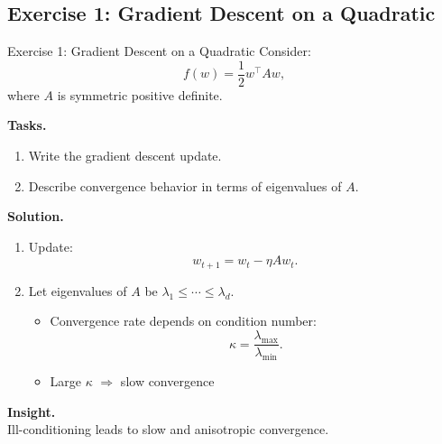 \documentclass[aspectratio=169,11pt]{beamer}
\begin{document}
\subsection{Exercise 1: Gradient Descent on a Quadratic}
\begin{frame}[t,allowframebreaks]{Exercise 1: Gradient Descent on a Quadratic}
\small
Consider:
\[
f(w) = \frac{1}{2} w^\top A w,
\]
where $A$ is symmetric positive definite.

\textbf{Tasks.}\\ \begin{enumerate}
    \item Write the gradient descent update.
    \item Describe convergence behavior in terms of eigenvalues of $A$.
\end{enumerate}

\textbf{Solution.}\\ \begin{enumerate}
\item Update:
\[
w_{t+1} = w_t - \eta A w_t.
\]

\item Let eigenvalues of $A$ be $\lambda_1 \leq \cdots \leq \lambda_d$.

\begin{itemize}
    \item Convergence rate depends on condition number:
    \[
    \kappa = \frac{\lambda_{\max}}{\lambda_{\min}}.
    \]
    \item Large $\kappa$ $\Rightarrow$ slow convergence
\end{itemize}
\end{enumerate}

\textbf{Insight.}\\ Ill-conditioning leads to slow and anisotropic convergence.
\end{frame}
\end{document}
